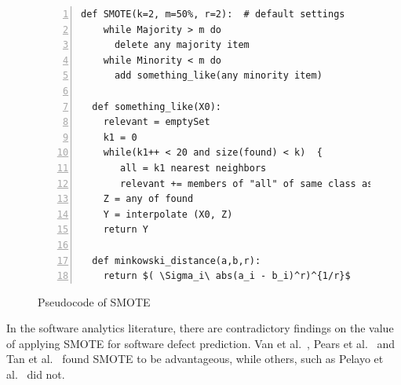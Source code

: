 \documentclass[sigconf,review, anonymous]{acmart}
\theoremstyle{break}
\theoremstyle{break}
\begin{document}
 \begin{figure}[!b]\small
\begin{lstlisting}[mathescape,linewidth=8.0cm,frame=l,numbers=left]
  def SMOTE(k=2, m=50%, r=2):  # default settings
    while Majority > m do
      delete any majority item
    while Minority < m do
      add something_like(any minority item)
      
  def something_like(X0): 
    relevant = emptySet
    k1 = 0
    while(k1++ < 20 and size(found) < k)  {
       all = k1 nearest neighbors
       relevant += members of "all" of same class as X0 }
    Z = any of found
    Y = interpolate (X0, Z)
    return Y
    
  def minkowski_distance(a,b,r): 
    return $( \Sigma_i\ abs(a_i - b_i)^r)^{1/r}$
\end{lstlisting} 
\caption{Pseudocode of SMOTE}
\label{fig:pseudocode}   
\end{figure}



In the software analytics literature, there are contradictory findings on
the value of applying SMOTE for software defect prediction.
Van et al.~\cite{van2007experimental}, Pears et al.~\cite{pears2014synthetic} and Tan et al.~\cite{tan2015online} found SMOTE to be advantageous, while others, such as Pelayo et al.~\cite{pelayo2007applying} did not. 
\end{document}
